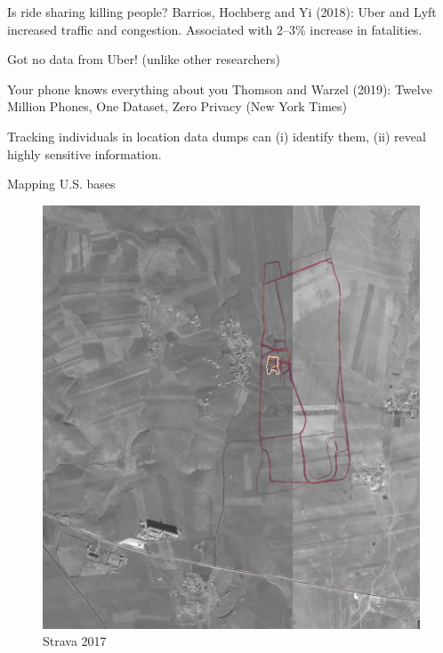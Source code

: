 \documentclass[
  ignorenonframetext,
  aspectratio=54,
]{beamer}
\begin{document}
\begin{frame}{Is ride sharing killing people?}
\protect\hypertarget{is-ride-sharing-killing-people}{}
Barrios, Hochberg and Yi (2018): Uber and Lyft increased traffic and
congestion. Associated with 2--3\% increase in fatalities.

Got no data from Uber! (unlike other researchers)
\end{frame}

\begin{frame}{Your phone knows everything about you}
\protect\hypertarget{your-phone-knows-everything-about-you}{}
Thomson and Warzel (2019): Twelve Million Phones, One Dataset, Zero
Privacy (New York Times)

Tracking individuals in location data dumps can (i) identify them, (ii)
reveal highly sensitive information.
\end{frame}

\begin{frame}{Mapping U.S. bases}
\protect\hypertarget{mapping-u.s.-bases}{}
\begin{figure}
\centering
\includegraphics{exhibit/fig/strava.jpeg}
\caption{Strava 2017}
\end{figure}
\end{frame}
\end{document}
